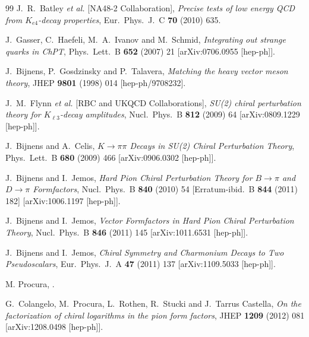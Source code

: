 \documentclass[cits,hyper]{PoS}
\begin{document}
\begin{thebibliography}{99}
  J.~R.~Batley {\it et al.}  [NA48-2 Collaboration],
  \emph{Precise tests of low energy QCD from $K_{e4}$-decay properties},
  Eur.\ Phys.\ J.\ C {\bf 70} (2010) 635.

  J.~Gasser, C.~Haefeli, M.~A.~Ivanov and M.~Schmid,
  \emph{Integrating out strange quarks in ChPT},
  Phys.\ Lett.\ B {\bf 652} (2007) 21
  [arXiv:0706.0955 [hep-ph]].

  J.~Bijnens, P.~Gosdzinsky and P.~Talavera,
  \emph{Matching the heavy vector meson theory},
  JHEP {\bf 9801} (1998) 014
  [hep-ph/9708232].

  J.~M.~Flynn {\it et al.}  [RBC and UKQCD Collaborations],
  \emph{SU(2) chiral perturbation theory for $K_{\ell3}$-decay amplitudes},
  Nucl.\ Phys.\ B {\bf 812} (2009) 64
  [arXiv:0809.1229 [hep-ph]].

  J.~Bijnens and A.~Celis,
  \emph{$K\to\pi\pi$ Decays in SU(2) Chiral Perturbation Theory},
  Phys.\ Lett.\ B {\bf 680} (2009) 466
  [arXiv:0906.0302 [hep-ph]].

  J.~Bijnens and I.~Jemos,
  \emph{Hard Pion Chiral Perturbation Theory for $B\to\pi$ and $D\to\pi$ Formfactors},
  Nucl.\ Phys.\ B {\bf 840} (2010) 54
   [Erratum-ibid.\ B {\bf 844} (2011) 182]
  [arXiv:1006.1197 [hep-ph]].

  J.~Bijnens and I.~Jemos,
  \emph{Vector Formfactors in Hard Pion Chiral Perturbation Theory},
  Nucl.\ Phys.\ B {\bf 846} (2011) 145
  [arXiv:1011.6531 [hep-ph]].

  J.~Bijnens and I.~Jemos,
  \emph{Chiral Symmetry and Charmonium Decays to Two Pseudoscalars},
  Eur.\ Phys.\ J.\ A {\bf 47} (2011) 137
  [arXiv:1109.5033 [hep-ph]].

M. Procura, .

  G.~Colangelo, M.~Procura, L.~Rothen, R.~Stucki and J.~Tarrus Castella,
  \emph{On the factorization of chiral logarithms in the pion form factors},
  JHEP {\bf 1209} (2012) 081
  [arXiv:1208.0498 [hep-ph]].


\end{thebibliography}
\end{document}

